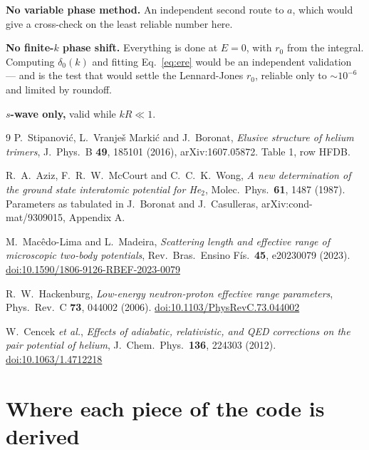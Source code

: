 \documentclass[11pt,a4paper]{article}
\begin{document}
\textbf{No variable phase method.} An independent second route to $a$, which
would give a cross-check on the least reliable number here.

\textbf{No finite-$k$ phase shift.} Everything is done at $E=0$, with $r_0$ from
the integral. Computing $\delta_0(k)$ and fitting Eq.~\eqref{eq:ere} would be an
independent validation --- and is the test that would settle the Lennard-Jones
$r_0$, reliable only to $\sim10^{-6}$ and limited by roundoff.

\textbf{$s$-wave only,} valid while $kR \ll 1$.

\begin{thebibliography}{9}
  P.~Stipanović, L.~Vranješ Markić and J.~Boronat,
  \emph{Elusive structure of helium trimers},
  J.\ Phys.\ B \textbf{49}, 185101 (2016), arXiv:1607.05872. Table 1, row HFDB.

  R.~A.~Aziz, F.~R.~W.~McCourt and C.~C.~K.~Wong,
  \emph{A new determination of the ground state interatomic potential for He$_2$},
  Molec.\ Phys.\ \textbf{61}, 1487 (1987). Parameters as tabulated in
  J.~Boronat and J.~Casulleras, arXiv:cond-mat/9309015, Appendix A.

  M.~Macêdo-Lima and L.~Madeira,
  \emph{Scattering length and effective range of microscopic two-body potentials},
  Rev.\ Bras.\ Ensino Fís.\ \textbf{45}, e20230079 (2023).
  \href{https://doi.org/10.1590/1806-9126-RBEF-2023-0079}{doi:10.1590/1806-9126-RBEF-2023-0079}

  R.~W.~Hackenburg,
  \emph{Low-energy neutron-proton effective range parameters},
  Phys.\ Rev.\ C \textbf{73}, 044002 (2006).
  \href{https://doi.org/10.1103/PhysRevC.73.044002}{doi:10.1103/PhysRevC.73.044002}

  W.~Cencek \emph{et al.},
  \emph{Effects of adiabatic, relativistic, and QED corrections on the pair
  potential of helium},
  J.\ Chem.\ Phys.\ \textbf{136}, 224303 (2012).
  \href{https://doi.org/10.1063/1.4712218}{doi:10.1063/1.4712218}
\end{thebibliography}


\appendix
\section{Where each piece of the code is derived}
\end{document}

